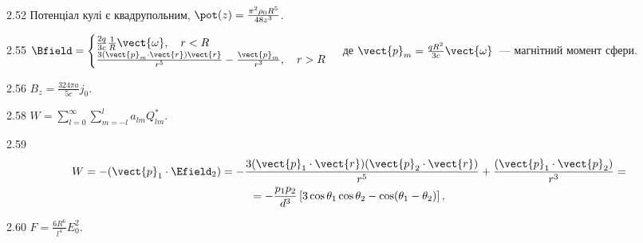 \begin{Solution}{2.{52}}
	Потенціал кулі є квадрупольним, $\pot(z) = \frac{\pi^2\rho_0 R^5}{48z^3}$.
\end{Solution}
\begin{Solution}{2.{55}}
	$\Bfield =
		\begin{cases}
			\frac{2q}{3c}\frac1R\vect{\omega}, \quad r < R \\
			\frac{3(\vect{p}_m \cdot \vect{r})\vect{r}}{r^5} - \frac{\vect{p}_m}{r^3}, \quad r > R
		\end{cases}
	$
	де $\vect{p}_m = \frac{qR^2}{3c}\vect{\omega}$~--- магнітний момент сфери.
\end{Solution}
\begin{Solution}{2.{56}}
	$B_z = \frac{324\pi a}{5c}j_0$.
\end{Solution}
\begin{Solution}{2.{58}}
    $W = \sum\limits_{l=0}^{\infty}\sum\limits_{m=-l}^{l}a_{lm}Q_{lm}^*$.
\end{Solution}
\begin{Solution}{2.{59}}
    \begin{multline*}
    	W = -(\vect{p}_1\cdot \Efield_2) = -\frac{3(\vect{p}_1\cdot\vect{r})(\vect{p}_2\cdot\vect{r})}{r^5}  + \frac{(\vect{p}_1\cdot\vect{p}_2)}{r^3} =\\ = -\frac{p_1p_2}{d^3}\left[ 3\cos\theta_1\cos\theta_2 - \cos(\theta_1 - \theta_2)\right] ,
    \end{multline*}
\end{Solution}
\begin{Solution}{2.{60}}
	$F = \frac{6R^6}{l^4} E_0^2$.
\end{Solution}
